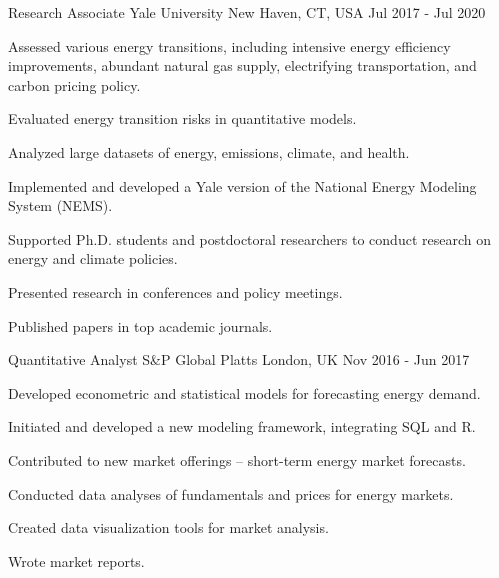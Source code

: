 \begin{cventries}
    \cventry
    {Research Associate} %
    {Yale University} %
    {New Haven, CT, USA} %
    {Jul 2017 - Jul 2020} %
    {
        \begin{cvitems} %
            \item {Assessed various energy transitions, including intensive energy efficiency improvements, abundant natural gas supply, electrifying transportation, and carbon pricing policy.}
            \item {Evaluated energy transition risks in quantitative models.}
            \item {Analyzed large datasets of energy, emissions, climate, and health.}
            \item {Implemented and developed a Yale version of the National Energy Modeling System (NEMS).}
            \item {Supported Ph.D. students and postdoctoral researchers to conduct research on energy and climate policies.}
            \item {Presented research in conferences and policy meetings.}
            \item {Published papers in top academic journals.}
        \end{cvitems}
    }

    \cventry
    {Quantitative Analyst} %
    {S\&P Global Platts} %
    {London, UK} %
    {Nov 2016 - Jun 2017} %
    {
        \begin{cvitems} %
            \item {Developed econometric and statistical models for forecasting energy demand.}
            \item {Initiated and developed a new modeling framework, integrating SQL and R.}
            \item {Contributed to new market offerings -- short-term energy market forecasts.}
            \item {Conducted data analyses of fundamentals and prices for energy markets.}
            \item {Created data visualization tools for market analysis.}
            \item {Wrote market reports.}
        \end{cvitems}
    }


\end{cventries}
